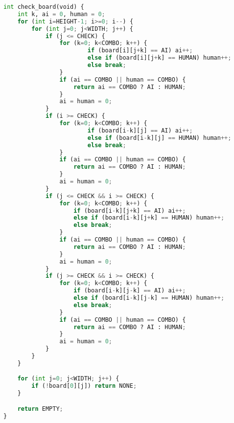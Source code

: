 \documentclass[11pt,letterpaper]{article}
\begin{document}
\begin{lstlisting}[language=Python]
int check_board(void) {
    int k, ai = 0, human = 0;
    for (int i=HEIGHT-1; i>=0; i--) {
        for (int j=0; j<WIDTH; j++) {
            if (j <= CHECK) {
                for (k=0; k<COMBO; k++) {
                        if (board[i][j+k] == AI) ai++;
                        else if (board[i][j+k] == HUMAN) human++;
                        else break;
                }
                if (ai == COMBO || human == COMBO) {
                    return ai == COMBO ? AI : HUMAN;
                }
                ai = human = 0;
            }
            if (i >= CHECK) {
                for (k=0; k<COMBO; k++) {
                        if (board[i-k][j] == AI) ai++;
                        else if (board[i-k][j] == HUMAN) human++;
                        else break;
                }
                if (ai == COMBO || human == COMBO) {
                    return ai == COMBO ? AI : HUMAN;
                }
                ai = human = 0;
            }
            if (j <= CHECK && i >= CHECK) {
                for (k=0; k<COMBO; k++) {
                    if (board[i-k][j+k] == AI) ai++;
                    else if (board[i-k][j+k] == HUMAN) human++;
                    else break;
                }
                if (ai == COMBO || human == COMBO) {
                    return ai == COMBO ? AI : HUMAN;
                }
                ai = human = 0;
            }
            if (j >= CHECK && i >= CHECK) {
                for (k=0; k<COMBO; k++) {
                    if (board[i-k][j-k] == AI) ai++;
                    else if (board[i-k][j-k] == HUMAN) human++;
                    else break;
                }
                if (ai == COMBO || human == COMBO) {
                    return ai == COMBO ? AI : HUMAN;
                }
                ai = human = 0;
            }
        }
    }

    for (int j=0; j<WIDTH; j++) {
        if (!board[0][j]) return NONE;
    }

    return EMPTY;
}


\end{lstlisting}
\end{document}
